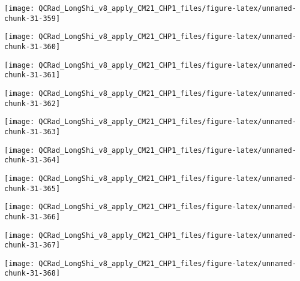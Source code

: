 \documentclass[
  10pt,
  a4paper,oneside]{article}
\begin{document}
\begin{center}\texttt{[image: QCRad\_LongShi\_v8\_apply\_CM21\_CHP1\_files/figure-latex/unnamed-chunk-31-359]} \end{center}

\begin{center}\texttt{[image: QCRad\_LongShi\_v8\_apply\_CM21\_CHP1\_files/figure-latex/unnamed-chunk-31-360]} \end{center}

\begin{center}\texttt{[image: QCRad\_LongShi\_v8\_apply\_CM21\_CHP1\_files/figure-latex/unnamed-chunk-31-361]} \end{center}

\begin{center}\texttt{[image: QCRad\_LongShi\_v8\_apply\_CM21\_CHP1\_files/figure-latex/unnamed-chunk-31-362]} \end{center}

\begin{center}\texttt{[image: QCRad\_LongShi\_v8\_apply\_CM21\_CHP1\_files/figure-latex/unnamed-chunk-31-363]} \end{center}

\begin{center}\texttt{[image: QCRad\_LongShi\_v8\_apply\_CM21\_CHP1\_files/figure-latex/unnamed-chunk-31-364]} \end{center}

\begin{center}\texttt{[image: QCRad\_LongShi\_v8\_apply\_CM21\_CHP1\_files/figure-latex/unnamed-chunk-31-365]} \end{center}

\begin{center}\texttt{[image: QCRad\_LongShi\_v8\_apply\_CM21\_CHP1\_files/figure-latex/unnamed-chunk-31-366]} \end{center}

\begin{center}\texttt{[image: QCRad\_LongShi\_v8\_apply\_CM21\_CHP1\_files/figure-latex/unnamed-chunk-31-367]} \end{center}

\begin{center}\texttt{[image: QCRad\_LongShi\_v8\_apply\_CM21\_CHP1\_files/figure-latex/unnamed-chunk-31-368]} \end{center}
\end{document}
